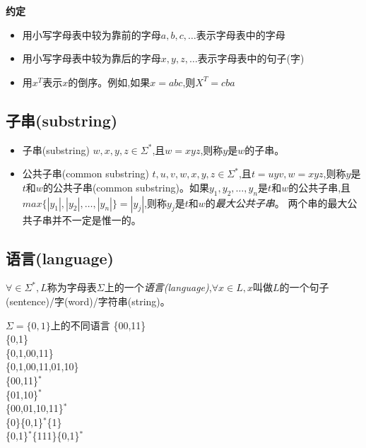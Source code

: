 \noindent \textbf{约定}
\begin{itemize}
	\item 用小写字母表中较为靠前的字母$a,b,c,\dots$表示字母表中的字母
	\item 用小写字母表中较为靠后的字母$x,y,z,\dots$表示字母表中的句子(字)
	\item 用$x^T$表示$x$的倒序。例如,如果$x=abc$,则$X^T=cba$
\end{itemize}

\subsection{子串(substring)}
\begin{itemize}
	\item 子串(substring)
		\subitem{-} $w,x,y,z\in \Sigma^{\ast}$,且$w=xyz$,则称$y$是$w$的子串。
	\item 公共子串(common substring)
		\subitem{-} $t,u,v,w,x,y,z\in \Sigma^{\ast}$,且$t=uyv,w=xyz$,则称$y$是$t$和$w$的公共子串(common substring)。如果$y_1,y_2,\dots,y_n$是$t$和$w$的公共子串,且$max\{|y_1|,|y_2|,\dots,|y_n|\}=|y_j|$,则称$y_j$是$t$和$w$的\emph{最大公共子串}。
		\subitem{-} 两个串的最大公共子串并不一定是惟一的。
\end{itemize}

\subsection{语言(language)}
$\forall \in\Sigma^{\ast},L$称为字母表$\Sigma$上的一个\emph{语言(language)},$\forall x\in L,x$叫做$L$的一个句子(sentence)/字(word)/字符串(string)。
\begin{example}
	$\Sigma = \{0,1\}$上的不同语言
	\{00,11\}\\
	\{0,1\}\\
	\{0,1,00,11\}\\
	\{0,1,00,11,01,10\}\\
	\{00,11\}$^{\ast}$\\
	\{01,10\}$^{\ast}$\\
	\{00,01,10,11\}$^{\ast}$\\
	\{0\}\{0,1\}$^{\ast}$\{1\}\\
	\{0,1\}$^{\ast}$\{111\}\{0,1\}$^{\ast}$\\
\end{example}

